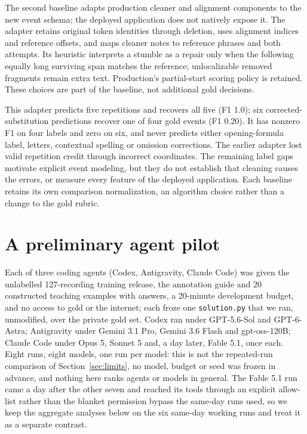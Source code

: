 \documentclass{article}
\begin{document}
The second baseline adapts production cleaner and alignment components to the new event schema; the deployed application does not natively expose it. The adapter retains original token identities through deletion, uses alignment indices and reference offsets, and maps cleaner notes to reference phrases and both attempts. Its heuristic interprets a stumble as a repair only when the following equally long surviving span matches the reference; unlocalizable removed fragments remain extra text. Production's partial-start scoring policy is retained. These choices are part of the baseline, not additional gold decisions.

This adapter predicts five repetitions and recovers all five (F1 1.0); six corrected-substitution predictions recover one of four gold events (F1 0.20). It has nonzero F1 on four labels and zero on six, and never predicts either opening-formula label, letters, contextual spelling or omission corrections. The earlier adapter lost valid repetition credit through incorrect coordinates. The remaining label gaps motivate explicit event modeling, but they do not establish that cleaning causes the errors, or measure every feature of the deployed application. Each baseline retains its own comparison normalization, an algorithm choice rather than a change to the gold rubric.

\section{A preliminary agent pilot}\label{sec:pilot}
Each of three coding agents (Codex, Antigravity, Claude Code) was given the unlabelled 127-recording training release, the annotation guide and 20 constructed teaching examples with answers, a 20-minute development budget, and no access to gold or the internet; each froze one \texttt{solution.py} that we ran, unmodified, over the private gold set. Codex ran under GPT-5.6-Sol and GPT-6-Astra; Antigravity under Gemini 3.1 Pro, Gemini 3.6 Flash and gpt-oss-120B; Claude Code under Opus 5, Sonnet 5 and, a day later, Fable 5.1, once each. Eight runs, eight models, one run per model: this is not the repeated-run comparison of Section~\ref{sec:limits}, no model, budget or seed was frozen in advance, and nothing here ranks agents or models in general. The Fable 5.1 run came a day after the other seven and reached its tools through an explicit allow-list rather than the blanket permission bypass the same-day runs used, so we keep the aggregate analyses below on the six same-day working runs and treat it as a separate contrast.
\end{document}
